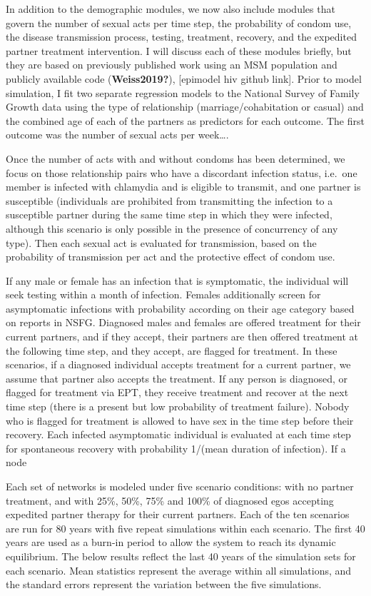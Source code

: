 \documentclass [11pt, proquest] {uwthesis}[2015/03/03]
\begin{document}
In addition to the demographic modules, we now also include modules that govern the number of sexual acts per time step, the probability of condom use, the disease transmission process, testing, treatment, recovery, and the expedited partner treatment intervention. I will discuss each of these modules briefly, but they are based on previously published work using an MSM population and publicly available code (\textbf{Weiss2019?}), {[}epimodel hiv github link{]}. Prior to model simulation, I fit two separate regression models to the National Survey of Family Growth data using the type of relationship (marriage/cohabitation or casual) and the combined age of each of the partners as predictors for each outcome. The first outcome was the number of sexual acts per week\ldots.

Once the number of acts with and without condoms has been determined, we focus on those relationship pairs who have a discordant infection status, i.e.~one member is infected with chlamydia and is eligible to transmit, and one partner is susceptible (individuals are prohibited from transmitting the infection to a susceptible partner during the same time step in which they were infected, although this scenario is only possible in the presence of concurrency of any type). Then each sexual act is evaluated for transmission, based on the probability of transmission per act and the protective effect of condom use.

If any male or female has an infection that is symptomatic, the individual will seek testing within a month of infection. Females additionally screen for asymptomatic infections with probability according on their age category based on reports in NSFG. Diagnosed males and females are offered treatment for their current partners, and if they accept, their partners are then offered treatment at the following time step, and they accept, are flagged for treatment. In these scenarios, if a diagnosed individual accepts treatment for a current partner, we assume that partner also accepts the treatment. If any person is diagnosed, or flagged for treatment via EPT, they receive treatment and recover at the next time step (there is a present but low probability of treatment failure). Nobody who is flagged for treatment is allowed to have sex in the time step before their recovery. Each infected asymptomatic individual is evaluated at each time step for spontaneous recovery with probability 1/(mean duration of infection). If a node

Each set of networks is modeled under five scenario conditions: with no partner treatment, and with 25\%, 50\%, 75\% and 100\% of diagnosed egos accepting expedited partner therapy for their current partners. Each of the ten scenarios are run for 80 years with five repeat simulations within each scenario. The first 40 years are used as a burn-in period to allow the system to reach its dynamic equilibrium. The below results reflect the last 40 years of the simulation sets for each scenario. Mean statistics represent the average within all simulations, and the standard errors represent the variation between the five simulations.
\end{document}
